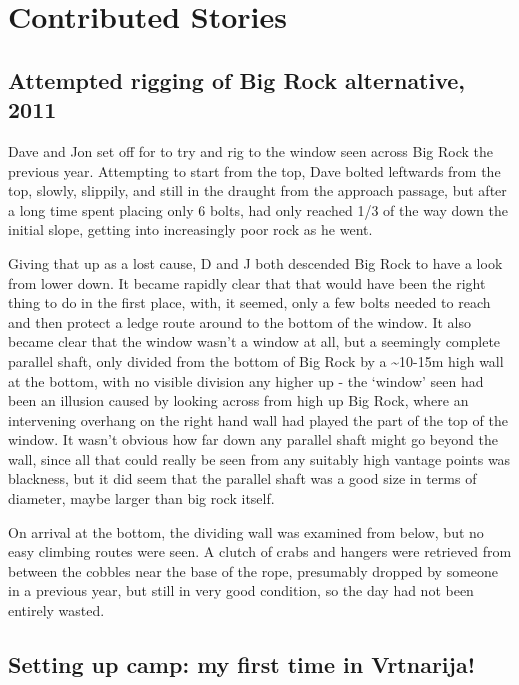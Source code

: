 \section{Contributed Stories}\label{contributed-stories}

\subsection{Attempted rigging of Big Rock alternative,
2011}\label{attempted-rigging-of-big-rock-alternative-2011}

Dave and Jon set off for to try and rig to the window seen across Big
Rock the previous year. Attempting to start from the top, Dave bolted
leftwards from the top, slowly, slippily, and still in the draught from
the approach passage, but after a long time spent placing only 6 bolts,
had only reached 1/3 of the way down the initial slope, getting into
increasingly poor rock as he went.

Giving that up as a lost cause, D and J both descended Big Rock to have
a look from lower down. It became rapidly clear that that would have
been the right thing to do in the first place, with, it seemed, only a
few bolts needed to reach and then protect a ledge route around to the
bottom of the window. It also became clear that the window wasn't a
window at all, but a seemingly complete parallel shaft, only divided
from the bottom of Big Rock by a \textasciitilde{}10-15m high wall at
the bottom, with no visible division any higher up - the `window' seen
had been an illusion caused by looking across from high up Big Rock,
where an intervening overhang on the right hand wall had played the part
of the top of the window. It wasn't obvious how far down any parallel
shaft might go beyond the wall, since all that could really be seen from
any suitably high vantage points was blackness, but it did seem that the
parallel shaft was a good size in terms of diameter, maybe larger than
big rock itself.

On arrival at the bottom, the dividing wall was examined from below, but
no easy climbing routes were seen. A clutch of crabs and hangers were
retrieved from between the cobbles near the base of the rope, presumably
dropped by someone in a previous year, but still in very good condition,
so the day had not been entirely wasted.


\subsection{Setting up camp: my first time in
Vrtnarija!}\label{setting-up-camp-my-first-time-in-vrtnarija}

